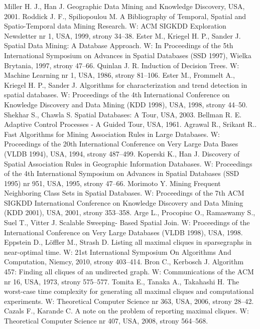 \documentclass[12pt]{article}
\begin{document}
\begin{thebibliography}{}
Miller H. J., Han J. Geographic Data Mining and Knowledge Discovery, USA, 2001.
Roddick J. F., Spiliopoulou M. A Bibliography of Temporal, Spatial and Spatio-Temporal data Mining Research. W: ACM SIGKDD Exploration Newsletter nr 1, USA, 1999, strony 34–38.
Ester M., Kriegel H. P., Sander J. Spatial Data Mining: A Database Approach. W: In Proceedings of the 5th International Symposium on Advances in Spatial Databases (SSD 1997), Wielka Brytania, 1997, strony 47–66.
Quinlan J. R. Induction of Decision Trees. W: Machine Learning nr 1, USA, 1986, strony 81–106.
Ester M., Frommelt A., Kriegel H. P., Sander J. Algorithms for characterization and trend detection in spatial databases. W: Proceedings of the 4th International Conference on Knowledge Discovery and Data Mining (KDD 1998), USA, 1998, strony 44–50.
Shekhar S., Chawla S. Spatial Databases: A Tour, USA, 2003.
Bellman R. E. Adaptive Control Processes - A Guided Tour, USA, 1961.
Agrawal R., Srikant R.. Fast Algorithms for Mining Association Rules in Large Databases. W: Proceedings of the 20th International Conference on Very Large Data Bases (VLDB 1994), USA, 1994, strony 487–499.
Koperski K., Han J. Discovery of Spatial Association Rules in Geographic Information Databases. W: Proceedings of the 4th International Symposium on Advances in Spatial Databases (SSD 1995) nr 951, USA, 1995, strony 47–66.
Morimoto Y. Mining Frequent Neighboring Class Sets in Spatial Databases. W: Proceedings of the 7th ACM SIGKDD International Conference on Knowledge Discovery and Data Mining (KDD 2001), USA, 2001, strony 353–358.
Arge L., Procopiuc O., Ramaswamy S., Suel T., Vitter J. Scalable Sweeping-
Based Spatial Join. W: Proceedings of the International Conference on Very Large Databases (VLDB 1998), USA, 1998.
Eppstein D., Löffler M., Strash D. Listing all maximal cliques in sparsegraphs in near-optimal time. W: 21st International Symposium On Algorithms And Computation, Niemcy, 2010, strony 403–414.
Bron C., Kerbosch J. Algorithm 457: Finding all cliques of an undirected graph. W: Communications of the ACM nr 16, USA, 1973, strony 575–577.
Tomita E., Tanaka A., Takahashi H. The worst-case time complexity for
generating all maximal cliques and computational experiments. W: Theoretical Computer Science nr 363, USA, 2006, strony 28–42.
Cazals F., Karande C. A note on the problem of reporting maximal cliques. W: Theoretical Computer Science nr 407, USA, 2008, strony 564–568.

\end{thebibliography}
\end{document}
